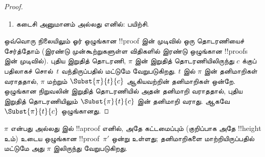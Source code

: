 \documentclass[../../../include/open-logic-section]{subfiles}
\begin{document}
\begin{proof}
\begin{enumerate}
    \item கடைசி அனுமானம்
    \RightR{\lexists} அல்லது
    \LeftR{\lexists} எனில்: பயிற்சி.
  \end{enumerate}
  ஒவ்வொரு நிலையிலும் ஓர் ஒழுங்கான
  !!{proof} இன் முடிவில் ஒரு தொடரணியைச்
  சேர்த்தோம் (இரண்டு முன்கூற்றுகளுள்ள
  விதிகளில் இரண்டு ஒழுங்கான !!{proof}s இன்
  முடிவில்). புதிய இறுதித் தொடரணி,
  $\pi$ இன் இறுதித் தொடரணியிலிருந்து
  $c$ க்குப் பதிலாகச் சொல்~$t$
  வந்திருப்பதில் மட்டுமே வேறுபடுகிறது.
  $t$ இல் $\pi$ இன் தனிமாறிகள் வராததால்,
  $\pi$ மற்றும் $\Subst{\pi}{t}{c}$
  ஆகியவற்றின் தனிமாறிகள் ஒன்றே.
  ஒழுங்கான நிறுவலின் இறுதித் தொடரணியில்
  அதன் தனிமாறி வராததால்,
  புதிய இறுதித் தொடரணியிலும்
  $\Subst{\pi}{t}{c}$ இன் தனிமாறி வராது.
  ஆகவே $\Subst{\pi}{t}{c}$ ஒழுங்கானது.
\end{proof}

\begin{prop}
$\pi$ என்பது  அல்லது 
இல் !!a{proof} எனில்,
அதே கட்டமைப்பும் (குறிப்பாக அதே !!{height} உம்)
உடைய ஒழுங்கான !!{proof}~$\pi'$ ஒன்று உள்ளது;
தனிமாறிகளை மாற்றியிருப்பதில் மட்டுமே
அது $\pi$ இலிருந்து வேறுபடுகிறது.
\end{prop}
\end{document}
